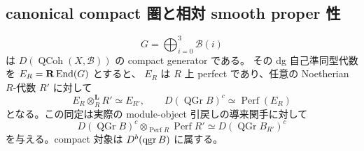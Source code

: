 \subsection{canonical compact 圏と相対 smooth proper 性}

\begin{proposition}\label{prop:nc-compact-generator}
\[
 G=\bigoplus_{i=0}^3\mathcal B(i)
\]
は $D(\operatorname{QCoh}(X,\mathcal B))$ の compact generator である。
その dg 自己準同型代数を $E_R=\mathbf R\operatorname{End}(G)$ とすると、
$E_R$ は $R$ 上 perfect であり、任意の Noetherian $R$-代数 $R'$ に対して
\[
 E_R\otimes_R^{\mathbf L}R'\simeq E_{R'},\qquad
 D(\operatorname{QGr} B)^c\simeq\operatorname{Perf}(E_R)
\]
となる。この同定は実際の module-object 引戻しの導来関手に対して
\[
 D(\operatorname{QGr} B)^c\otimes_{\operatorname{Perf} R}\operatorname{Perf} R'
 \simeq D(\operatorname{QGr} B_{R'})^c
 \tag{NCF-3}\label{eq:nc-perfect-basechange}
\]
を与える。compact 対象は $D^b(\operatorname{qgr} B)$ に属する。
\end{proposition}

